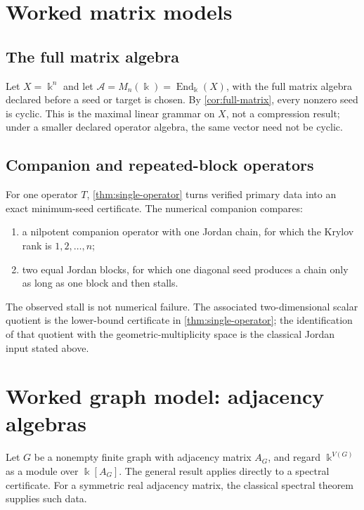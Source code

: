 \documentclass[11pt]{article}
\newcommand{\cA}{\mathcal A}\newcommand{\cB}{\mathcal B}\newcommand{\cP}{\mathcal P}
\theoremstyle{definition}
\theoremstyle{remark}
\theoremstyle{definition}\newtheorem{example}[theorem]{Example}
\newcommand{\bbk}{\Bbbk}
\newcommand{\End}{\operatorname{End}}
\begin{document}
\section{Worked matrix models}

\subsection{The full matrix algebra}

Let $X=\bbk^n$ and let $\cA=M_n(\bbk)=\End_{\bbk}(X)$, with the full matrix algebra declared before a seed or target is chosen. By \cref{cor:full-matrix}, every nonzero seed is cyclic. This is the maximal linear grammar on $X$, not a compression result; under a smaller declared operator algebra, the same vector need not be cyclic.

\subsection{Companion and repeated-block operators}

For one operator $T$, \cref{thm:single-operator} turns verified primary data
into an exact minimum-seed certificate.  The numerical companion compares:
\begin{enumerate}[label=(\alph*)]
\item a nilpotent companion operator with one Jordan chain, for which the Krylov rank is $1,2,\ldots,n$;
\item two equal Jordan blocks, for which one diagonal seed produces a chain only as long as one block and then stalls.
\end{enumerate}

The observed stall is not numerical failure.  The associated
two-dimensional scalar quotient is the lower-bound certificate in
\cref{thm:single-operator}; the identification of that quotient with the
geometric-multiplicity space is the classical Jordan input stated above.

\section{Worked graph model: adjacency algebras}

Let $G$ be a nonempty finite graph with adjacency matrix $A_G$, and regard
$\bbk^{V(G)}$ as a module over $\bbk[A_G]$.  The general result applies directly to a spectral certificate. For a symmetric real adjacency matrix, the classical spectral theorem supplies such data.
\end{document}
